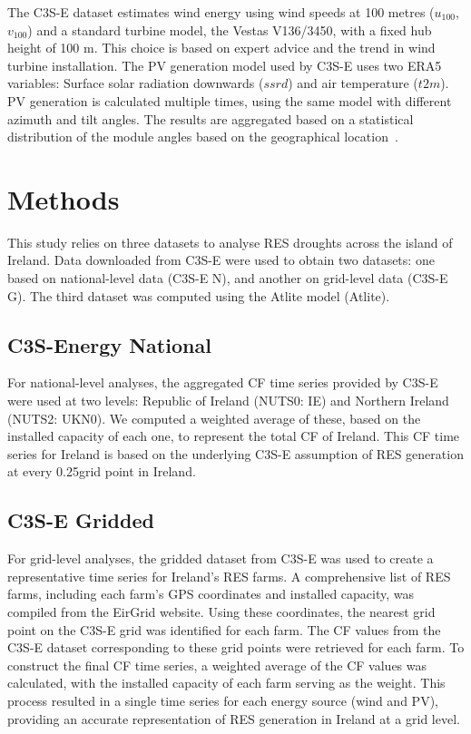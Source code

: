\documentclass[a4paper, 11pt]{article}
\begin{document}
The C3S-E dataset estimates wind energy using wind speeds at 100 metres ($u_{100}$, $v_{100}$) and a standard turbine model, the Vestas V136/3450, with a fixed hub height of 100 m. This choice is based on expert advice and the trend in wind turbine installation. The PV generation model used by C3S-E uses two ERA5 variables: Surface solar radiation downwards ($ssrd$) and air temperature ($t2m$). PV generation is calculated multiple times, using the same model with different azimuth and tilt angles. The results are aggregated based on a statistical distribution of the module angles based on the geographical location~\cite{saintdrenan2018solar}.

\section{Methods}
\label{sec:Methods}

This study relies on three datasets to analyse RES droughts across the island of Ireland. Data downloaded from C3S-E were used to obtain two datasets: one based on national-level data (C3S-E N), and another on grid-level data (C3S-E G). The third dataset was computed using the Atlite model (Atlite).

\subsection{C3S-Energy National}
\label{sec:c3se_n}

For national-level analyses, the aggregated CF time series provided by C3S-E were used at two levels: Republic of Ireland (NUTS0: IE) and Northern Ireland (NUTS2: UKN0). We computed a weighted average of these, based on the installed capacity of each one, to represent the total CF of Ireland. This CF time series for Ireland is based on the underlying C3S-E assumption of RES generation at every 0.25\textdegree grid point in Ireland.

\subsection{C3S-E Gridded}
\label{sec:c3se_g}

For grid-level analyses, the gridded dataset from C3S-E was used to create a representative time series for Ireland's RES farms. A comprehensive list of RES farms, including each farm’s GPS coordinates and installed capacity, was compiled from the EirGrid website. Using these coordinates, the nearest grid point on the C3S-E grid was identified for each farm. The CF values from the C3S-E dataset corresponding to these grid points were retrieved for each farm. To construct the final CF time series, a weighted average of the CF values was calculated, with the installed capacity of each farm serving as the weight. This process resulted in a single time series for each energy source (wind and PV), providing an accurate representation of RES generation in Ireland at a grid level.
\end{document}
